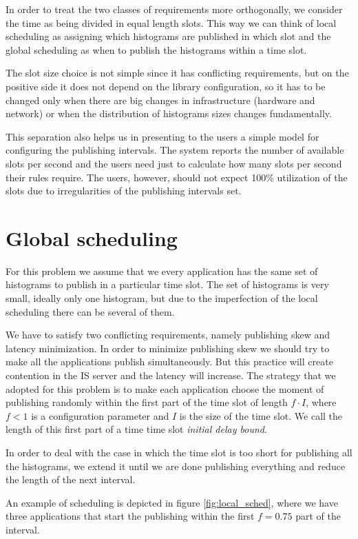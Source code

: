 In order to treat the two classes of requirements more orthogonally, we consider the time as being divided in equal length slots. This way we can think of local scheduling as assigning which histograms are published in which slot and the global scheduling as when to publish the histograms within a time slot.

The slot size choice is not simple since it has conflicting requirements, but on the positive side it does not depend on the library configuration, so it has to be changed only when there are big changes in infrastructure (hardware and network) or when the distribution of histograms sizes changes fundamentally.

This separation also helps us in presenting to the users a simple model for configuring the publishing intervals. The system reports the number of available slots per second and the users need just to calculate how many slots per second their rules require. The users, however, should not expect 100\% utilization of the slots due to irregularities of the publishing intervals set.

\section*{Global scheduling}

For this problem we assume that we every application has the same set of histograms to publish in a particular time slot. The set of histograms is very small, ideally only one histogram, but due to the imperfection of the local scheduling there can be several of them.

We have to satisfy two conflicting requirements, namely publishing skew and latency minimization. In order to minimize publishing skew we should try to make all the applications publish simultaneously. But this practice will create contention in the IS server and the latency will increase. 
The strategy that we adopted for this problem is to make each application choose the moment of publishing randomly within the first part of the time slot of length $f\cdot I$, where $f<1$ is a configuration parameter and $I$ is the size of the time slot. We call the length of this first part of a time time slot \emph{initial delay bound}.

In order to deal with the case in which the time slot is too short for publishing all the histograms, we extend it until we are done publishing everything and reduce the length of the next interval.

An example of scheduling is depicted in figure \ref{fig:local_sched}, where we have three applications that start the publishing within the first $f=0.75$ part of the interval.

